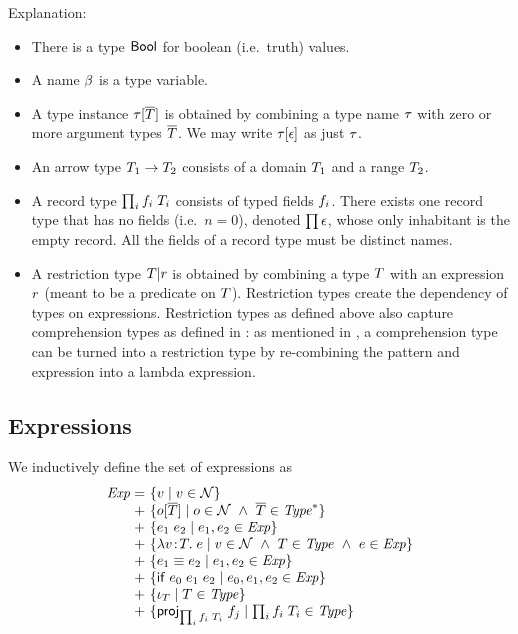 Explanation:
\begin{itemize}
\item
There is a type $\mathsf{Bool}$ for boolean (i.e.\ truth) values.
\item
A name $\beta$ is a type variable.
\item
A type instance $\tau[\overline{T}]$ is obtained by combining a type name $\tau$ with
zero or more argument types $\overline{T}$. We may write $\tau[\epsilon]$ as
just $\tau$.
\item
An arrow type $T_1\to T_2$ consists of a domain $T_1$ and a range $T_2$.
\item
A record type $\prod_{i}f_i\;T_i$ consists of typed fields $f_i$. There exists one
record type that has no fields (i.e.\ $n=0$), denoted $\prod\epsilon$, whose only
inhabitant is the empty record. All the fields of a record type must be
distinct names.
\item
A restriction type $T|r$ is obtained by combining a type $T$ with an
expression $r$ (meant to be a predicate on $T$). Restriction types
create the dependency of types on expressions. Restriction types as defined
above also capture comprehension types as defined in \cite{lm}: as mentioned
in \cite{lm}, a comprehension type can be turned into a restriction type by
re-combining the pattern and expression into a lambda expression.
\end{itemize}

\subsection{Expressions}

We inductively define the set of expressions as
\[
\setdefVIIIoI
 {\Expr}
 {+}
 {\setST{\var}{\var\in\Nam}}
 {\setST{\opO}{\onam\in\Nam\AND\typS\in\Seq{\Typ}}}
 {\setST{\appO}{\expr_1,\expr_2\in\Expr}}
 {\setST{\absO}{\var\in\Nam\AND\typ\in\Typ\AND\expr\in\Expr}}
 {\setST{\eqO}{\expr_1,\expr_2\in\Expr}}
 {\setST{\iifO}{\expr_0,\expr_1,\expr_2\in\Expr}}
 {\setST{\descopO}{\typ\in\Typ}}
\setdefVIIIoII
 {+}
 {\setST{\projopO}{\trecO\in\Typ}}
\]

